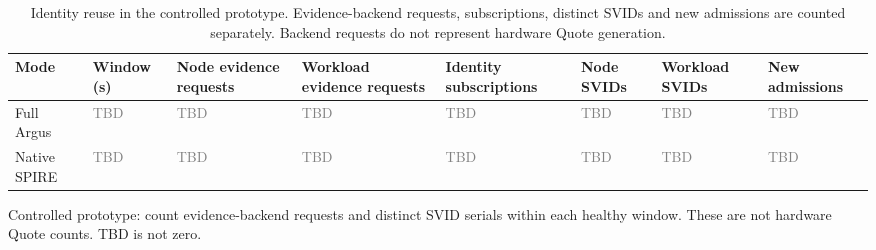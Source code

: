 \documentclass[10pt]{article}
\begin{document}
\clearpage
\begin{table}[t]
\centering
\scriptsize
\setlength{\tabcolsep}{3pt}
\caption{Identity reuse in the controlled prototype. Evidence-backend requests, subscriptions, distinct SVIDs and new admissions are counted separately. Backend requests do not represent hardware Quote generation.}
\label{tab:argus-reuse}
\begin{tabularx}{\linewidth}{@{}Y Y Y Y Y Y Y Y@{}}
\toprule
\textbf{Mode} & \textbf{Window (s)} & \textbf{Node evidence requests} & \textbf{Workload evidence requests} & \textbf{Identity subscriptions} & \textbf{Node SVIDs} & \textbf{Workload SVIDs} & \textbf{New admissions} \\
\midrule
Full Argus & \textcolor{gray}{TBD} & \textcolor{gray}{TBD} & \textcolor{gray}{TBD} & \textcolor{gray}{TBD} & \textcolor{gray}{TBD} & \textcolor{gray}{TBD} & \textcolor{gray}{TBD} \\
Native SPIRE & \textcolor{gray}{TBD} & \textcolor{gray}{TBD} & \textcolor{gray}{TBD} & \textcolor{gray}{TBD} & \textcolor{gray}{TBD} & \textcolor{gray}{TBD} & \textcolor{gray}{TBD} \\
\bottomrule
\end{tabularx}\par\smallskip\footnotesize Controlled prototype: count evidence-backend requests and distinct SVID serials within each healthy window. These are not hardware Quote counts. TBD is not zero.
\end{table}
\clearpage
\end{document}
